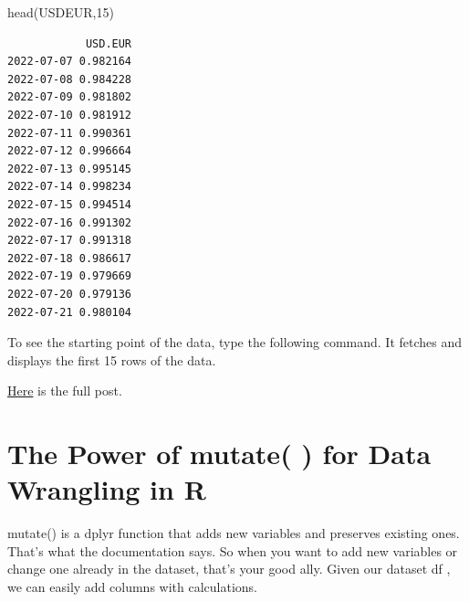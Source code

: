 \documentclass[
  letterpaper,
  DIV=11,
  numbers=noendperiod]{scrreprt}
\newenvironment{Shaded}{\begin{snugshade}}{\end{snugshade}}
\newcommand{\DecValTok}[1]{\textcolor[rgb]{0.68,0.00,0.00}{#1}}
\newcommand{\FunctionTok}[1]{\textcolor[rgb]{0.28,0.35,0.67}{#1}}
\newcommand{\NormalTok}[1]{\textcolor[rgb]{0.00,0.23,0.31}{#1}}
\begin{document}
\begin{Shaded}
\begin{Highlighting}[]
\FunctionTok{head}\NormalTok{(USDEUR,}\DecValTok{15}\NormalTok{)}
\end{Highlighting}
\end{Shaded}

\begin{verbatim}
            USD.EUR
2022-07-07 0.982164
2022-07-08 0.984228
2022-07-09 0.981802
2022-07-10 0.981912
2022-07-11 0.990361
2022-07-12 0.996664
2022-07-13 0.995145
2022-07-14 0.998234
2022-07-15 0.994514
2022-07-16 0.991302
2022-07-17 0.991318
2022-07-18 0.986617
2022-07-19 0.979669
2022-07-20 0.979136
2022-07-21 0.980104
\end{verbatim}

To see the starting point of the data, type the following command. It
fetches and displays the first 15 rows of the data.

\href{https://financetrain.com/downloading-data-using-quantmod-package-in-r}{Here}
is the full post.

\hypertarget{the-power-of-mutate-for-data-wrangling-in-r}{%
\section{The Power of mutate( ) for Data Wrangling in
R}\label{the-power-of-mutate-for-data-wrangling-in-r}}

mutate() is a dplyr function that adds new variables and preserves
existing ones. That's what the documentation says. So when you want to
add new variables or change one already in the dataset, that's your good
ally. Given our dataset df , we can easily add columns with
calculations.
\end{document}
